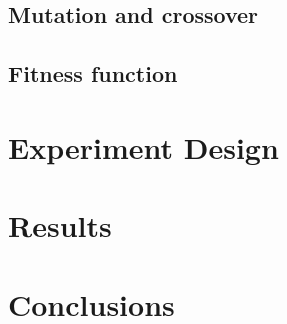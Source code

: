 \documentclass{article}
\begin{document}
\subsection{Mutation and crossover}

\subsection{Fitness function}


\section{Experiment Design}\label{experimentdesign}

\section{Results}\label{results}

\section{Conclusions}\label{conclusions}



\end{document}
